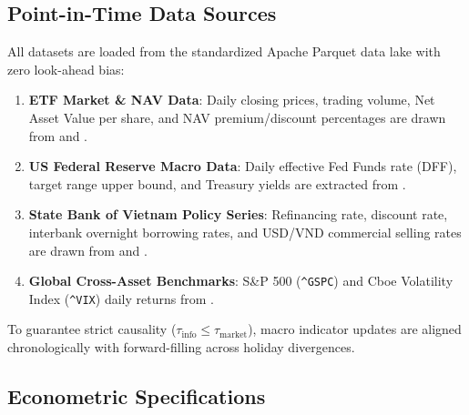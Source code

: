 \documentclass{article}
\begin{document}
\subsection{Point-in-Time Data Sources}

All datasets are loaded from the standardized Apache Parquet data lake with zero look-ahead bias:
\begin{enumerate}
    \item \textbf{ETF Market \& NAV Data}: Daily closing prices, trading volume, Net Asset Value per share, and NAV premium/discount percentages are drawn from  and .
    \item \textbf{US Federal Reserve Macro Data}: Daily effective Fed Funds rate (DFF), target range upper bound, and Treasury yields are extracted from .
    \item \textbf{State Bank of Vietnam Policy Series}: Refinancing rate, discount rate, interbank overnight borrowing rates, and USD/VND commercial selling rates are drawn from  and .
    \item \textbf{Global Cross-Asset Benchmarks}: S\&P 500 (\texttt{\textasciicircum GSPC}) and Cboe Volatility Index (\texttt{\textasciicircum VIX}) daily returns from .
\end{enumerate}

To guarantee strict causality ($\tau_{\text{info}} \le \tau_{\text{market}}$), macro indicator updates are aligned chronologically with forward-filling across holiday divergences.

\subsection{Econometric Specifications}
\end{document}
